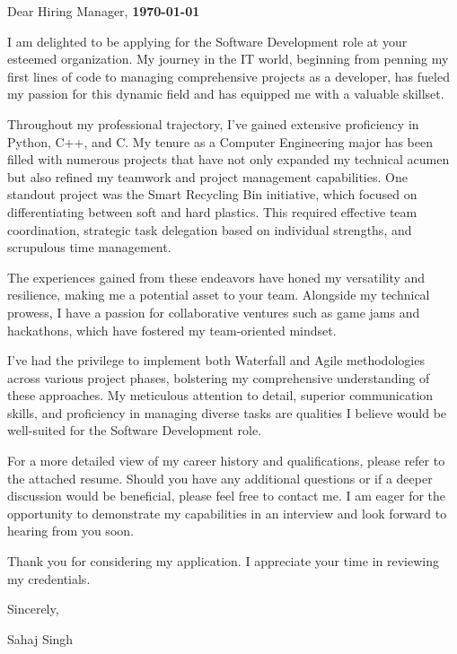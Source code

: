 \documentclass[letterpaper,11pt]{article}
\begin{document}
    \vspace*{10pt}
    \par Dear Hiring Manager,  \hfill \textbf{\today}
    \vspace*{10pt}
    \par I am delighted to be applying for the Software Development role at your esteemed organization. My journey in the IT world, beginning from penning my first lines of code to managing comprehensive projects as a developer, has fueled my passion for this dynamic field and has equipped me with a valuable skillset.
    \vspace*{10pt}
    \par Throughout my professional trajectory, I've gained extensive proficiency in Python, C++, and C. My tenure as a Computer Engineering major has been filled with numerous projects that have not only expanded my technical acumen but also refined my teamwork and project management capabilities. One standout project was the Smart Recycling Bin initiative, which focused on differentiating between soft and hard plastics. This required effective team coordination, strategic task delegation based on individual strengths, and scrupulous time management.
    \vspace*{10pt}
    \par The experiences gained from these endeavors have honed my versatility and resilience, making me a potential asset to your team. Alongside my technical prowess, I have a passion for collaborative ventures such as game jams and hackathons, which have fostered my team-oriented mindset.
    \vspace*{10pt}
    \par I've had the privilege to implement both Waterfall and Agile methodologies across various project phases, bolstering my comprehensive understanding of these approaches. My meticulous attention to detail, superior communication skills, and proficiency in managing diverse tasks are qualities I believe would be well-suited for the Software Development role.
    \vspace*{10pt}
    \par For a more detailed view of my career history and qualifications, please refer to the attached resume. Should you have any additional questions or if a deeper discussion would be beneficial, please feel free to contact me. I am eager for the opportunity to demonstrate my capabilities in an interview and look forward to hearing from you soon.
    \vspace*{10pt}
    \par Thank you for considering my application. I appreciate your time in reviewing my credentials.
    \vspace*{10pt}
    \par Sincerely,
    \par Sahaj Singh
\end{document}

